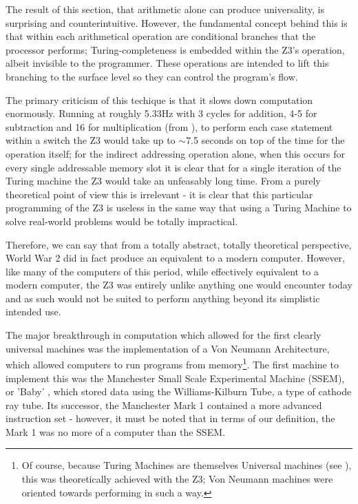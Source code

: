\documentclass[Master.tex]{subfiles}
\begin{document}
The result of this section, that arithmetic alone can produce universality, is surprising and counterintuitive. However, the fundamental concept behind this is that within each arithmetical operation are conditional branches that the processor performs; Turing-completeness is embedded within the Z3's operation, albeit invisible to the programmer. These operations are intended to lift this branching to the surface level so they can control the program's flow.

The primary criticism of this techique is that it slows down computation enormously. Running at roughly 5.33Hz with 3 cycles for addition, 4-5 for subtraction and 16 for multiplication (from \cite{rojas1997z3architecture}), to perform each case statement within a switch the Z3 would take up to $\sim$7.5 seconds on top of the time for the operation itself; for the indirect addressing operation alone, when this occurs for every single addressable memory slot it is clear that for a single iteration of the Turing machine the Z3 would take an unfeasably long time. From a purely theoretical point of view this is irrelevant - it is clear that this particular programming of the Z3 is useless in the same way that using a Turing Machine to solve real-world problems would be totally impractical.

Therefore, we can say that from a totally abstract, totally theoretical perspective, World War 2 did in fact produce an equivalent to a modern computer. However, like many of the computers of this period, while effectively equivalent to a modern computer, the Z3 was entirely unlike anything one would encounter today and as such would not be suited to perform anything beyond its simplistic intended use.

The major breakthrough in computation which allowed for the first clearly universal machines was the implementation of a Von Neumann Architecture, which allowed computers to run programs from memory\footnote{Of course, because Turing Machines are themselves Universal machines (see \cite{turing1936computablenumbers}), this was theoretically achieved with the Z3; Von Neumann machines were oriented towards performing in such a way.}. The first machine to implement this was the Manchester Small Scale Experimental Machine (SSEM), or 'Baby' \cite{napperWEB17baby}, which stored data using the Williams-Kilburn Tube, a type of cathode ray tube. Its successor, the Manchester Mark 1 contained a more advanced instruction set - however, it must be noted that in terms of our definition, the Mark 1 was no more of a computer than the SSEM.
\end{document}
